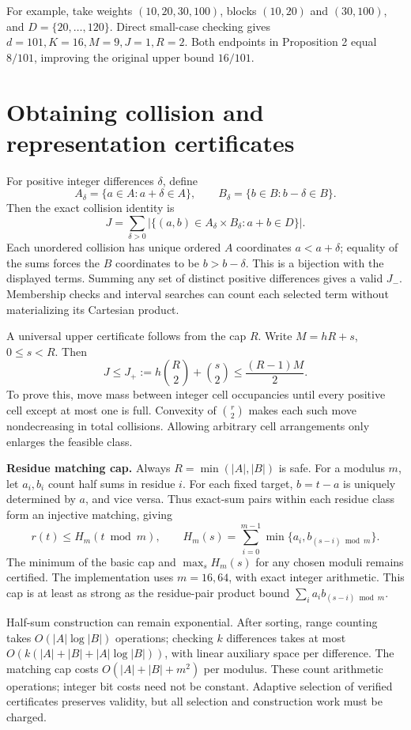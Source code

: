 \documentclass[10pt,english]{article}
\begin{document}
For example, take weights \((10,20,30,100)\), blocks \((10,20)\) and
\((30,100)\), and \(D=\{20,\ldots,120\}\). Direct small-case checking
gives \(d=101,K=16,M=9,J=1,R=2\). Both endpoints in Proposition 2
equal \(8/101\), improving the original upper bound \(16/101\).

\section{Obtaining collision and representation certificates}
For positive integer differences \(\delta\), define
\[
A_\delta=\{a\in A:a+\delta\in A\},\qquad
B_\delta=\{b\in B:b-\delta\in B\}.
\]
Then the exact collision identity is
\[
J=\sum_{\delta>0}
 |\{(a,b)\in A_\delta\times B_\delta:a+b\in D\}|.
\]
Each unordered collision has unique ordered \(A\) coordinates
\(a<a+\delta\); equality of the sums forces the \(B\) coordinates
to be \(b>b-\delta\). This is a bijection with the displayed terms.
Summing any set of distinct positive differences gives a valid \(J_-\).
Membership checks and interval searches can count each selected term
without materializing its Cartesian product.

A universal upper certificate follows from the cap \(R\). Write
\(M=hR+s\), \(0\le s<R\). Then
\[
J\le J_+:=h\binom R2+\binom s2\le\frac{(R-1)M}{2}.
\]
To prove this, move mass between integer cell occupancies until every
positive cell except at most one is full. Convexity of \(\binom r2\)
makes each such move nondecreasing in total collisions. Allowing arbitrary
cell arrangements only enlarges the feasible class.

\textbf{Residue matching cap.} Always \(R=\min(|A|,|B|)\) is safe.
For a modulus \(m\), let \(a_i,b_i\) count half sums in residue \(i\).
For each fixed target, \(b=t-a\) is uniquely determined by \(a\), and
vice versa. Thus exact-sum pairs within each residue class form an
injective matching, giving
\[
r(t)\le H_m(t\bmod m),\qquad
H_m(s)=\sum_{i=0}^{m-1}\min\{a_i,b_{(s-i)\bmod m}\}.
\]
The minimum of the basic cap and \(\max_s H_m(s)\) for any chosen
moduli remains certified. The implementation uses \(m=16,64\), with
exact integer arithmetic. This cap is at least as strong as the
residue-pair product bound \(\sum_i a_i b_{(s-i)\bmod m}\).

Half-sum construction can remain exponential. After sorting, range
counting takes \(O(|A|\log|B|)\) operations; checking \(k\)
differences takes at most
\(O(k(|A|+|B|+|A|\log|B|))\), with linear auxiliary space per
difference. The matching cap costs \(O(|A|+|B|+m^2)\) per modulus.
These count arithmetic operations; integer bit costs need not be
constant. Adaptive selection of verified certificates preserves validity,
but all selection and construction work must be charged.
\end{document}
